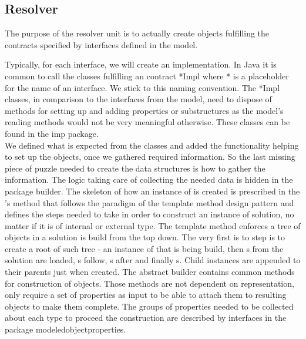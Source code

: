 \subsection{Resolver}

The purpose of the resolver unit is to actually create objects fulfilling the contracts specified by interfaces defined in the model.

Typically, for each interface, we will create an implementation. In Java it is common to call the classes fulfilling an contract *Impl where * is a placeholder for the name of an interface. We stick to this naming convention. 
The *Impl classes, in comparison to the interfaces from the model, need to dispose of methods for setting up and adding properties or substructures as the model's reading methods would not be very meaningful otherwise. These classes can be found in the imp package. \\

We defined what is expected from the classes and added the functionality helping to set up the objects, once we gathered required information. 
So the last missing piece of puzzle needed to create the data structures is how to gather the information.
The logic taking care of collecting the needed data is hidden in the package builder.
The skeleton of how an instance of  is created is prescribed in the 's method  that follows the paradigm of the template method design pattern and defines the steps needed to take in order to construct an instance of  solution, no matter if it is of internal or external type.
The template method enforces a tree of objects in a solution is build from the top down.
The very first is to step is to create a root of such tree - an instance of  that is being build, then s from the solution are loaded, s follow, s after and finally s. 
Child instances are appended to their parents just when created.
The abstract builder contains common methods for construction of objects. Those methods are not dependent on representation, only require a set of properties as input to be able to attach them to resulting objects to make them complete. The groups of properties needed to be collected about each type to proceed the construction are described by interfaces in the package modeledobjectproperties.

